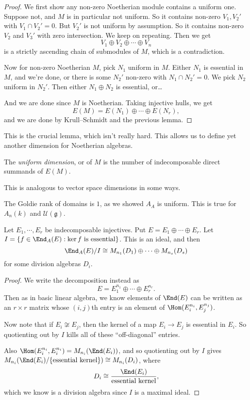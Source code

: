 \documentclass[a4paper]{article}
\begin{document}
\begin{proof}
  We first show any non-zero Noetherian module contains a uniform one. Suppose not, and $M$ is in particular not uniform. So it contains non-zero $V_1, V_2'$ with $V_1 \cap V_2' = 0$. But $V_2'$ is not uniform by assumption. So it contains non-zero $V_2$ and $V_3'$ with zero intersection. We keep on repeating. Then we get
  \[
    V_1 \oplus V_2 \oplus \cdots \oplus V_n
  \]
  is a strictly ascending chain of submodules of $M$, which is a contradiction.

  Now for non-zero Noetherian $M$, pick $N_1$ uniform in $M$. Either $N_1$ is essential in $M$, and we're done, or there is some $N_2'$ non-zero with $N_1 \cap N_2' = 0$. We pick $N_2$ uniform in $N_2'$. Then either $N_1 \oplus N_2$ is essential, or\ldots

  And we are done since $M$ is Noetherian. Taking injective hulls, we get
  \[
    E(M) = E(N_1) \oplus \cdots \oplus E(N_r),
  \]
  and we are done by Krull--Schmidt and the previous lemma.
\end{proof}

This is the crucial lemma, which isn't really hard. This allows us to define yet another dimension for Noetherian algebras.
\begin{defi}
  The \emph{uniform dimension}, or  of $M$ is the number of indecomposable direct summands of $E(M)$.
\end{defi}
This is analogous to vector space dimensions in some ways.

\begin{eg}
  The Goldie rank of domains is $1$, as we showed $A_A$ is uniform. This is true for $A_n(k)$ and $\mathcal{U}(\mathfrak{g})$.
\end{eg}

\begin{lemma}
  Let $E_1, \cdots, E_r$ be indecomposable injectives. Put $E = E_1 \oplus \cdots \oplus E_r$. Let $I = \{f \in \End_A(E): \ker f\text{ is essential}\}$. This is an ideal, and then
  \[
    \End_A(E)/I \cong M_{n_1}(D_1) \oplus \cdots \oplus M_{n_s}(D_s)
  \]
  for some division algebras $D_i$.
\end{lemma}

\begin{proof}
  We write the decomposition instead as
  \[
    E = E_1^{n_1} \oplus \cdots \oplus E_r^{n_r}.
  \]
  Then as in basic linear algebra, we know elements of $\End(E)$ can be written as an $r \times r$ matrix whose $(i, j)$th entry is an element of $\Hom(E_i^{n_i}, E_j^{n_j})$.

  Now note that if $E_i \not \cong E_j$, then the kernel of a map $E_i \to E_j$ is essential in $E_i$. So quotienting out by $I$ kills all of these ``off-diagonal'' entries.

  Also $\Hom(E_i^{n_i}, E_i^{n_i}) = M_{n_i}(\End(E_i))$, and so quotienting out by $I$ gives $M_{n_i}(\End(E_i)/\{\text{essential kernel}\}) \cong M_{n_i}(D_i)$, where
  \[
    D_i \cong \frac{\End(E_i)}{\text{essential kernel}},
  \]
  which we know is a division algebra since $I$ is a maximal ideal.
\end{proof}
\end{document}
